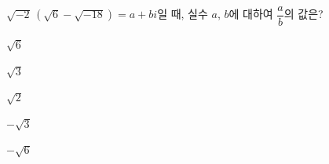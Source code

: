 $\sqrt{-2}\,(\sqrt{6}-\sqrt{-18})=a+bi$일 때, 실수 $a$, $b$에 대하여 $\dfrac{a}{b}$의 값은?
\begin{choices32}{\rule[-3ex]{0pt}{8ex}$\sqrt{6}$}{\rule[-3ex]{0pt}{8ex}$\sqrt{3}$}{\rule[-3ex]{0pt}{8ex}$\sqrt{2}$}{\rule[-3ex]{0pt}{8ex}$-\sqrt{3}$}{\rule[-3ex]{0pt}{8ex}$-\sqrt{6}$}\end{choices32}
